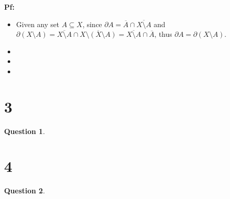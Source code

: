 \documentclass{article}
\newtheorem{question}{Question}
\begin{document}
\textbf{Pf:}

\begin{itemize}
    \item[1.] Given any set $A\subseteq X$, since $\partial A=\overline{A}\cap \overline{X\setminus A}$ and $\partial(X\setminus A)=\overline{X\setminus A}\cap \overline{X\setminus(X\setminus A)}=\overline{X\setminus A}\cap \overline{A}$,
    thus $\partial A=\partial (X\setminus A)$.

    \hfill

    \item[2.] 
    \item[3.]
    \item[4.]  
\end{itemize}

\break

\section*{3}
\begin{myBox}[]{}
    \begin{question}
        
    \end{question}
\end{myBox}

\break

\section*{4}
\begin{myBox}[]{}
    \begin{question}
        
    \end{question}
\end{myBox}
\end{document}

